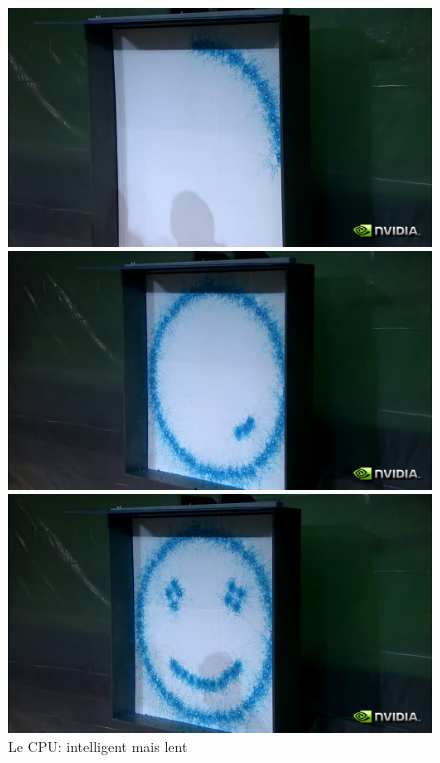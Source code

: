 \begin{figure}[h]
  \begin{minipage}[b]{0.30\linewidth}
    \centering
    \includegraphics[width=\linewidth]{images/pipeline/gpu00.png}
  \end{minipage}
  \hfill
  \begin{minipage}[b]{0.30\linewidth}
    \centering
    \includegraphics[width=\linewidth]{images/pipeline/gpu01.png}
  \end{minipage}
  \hfill
  \begin{minipage}[b]{0.30\linewidth}
    \centering
    \includegraphics[width=\linewidth]{images/pipeline/gpu02.png}
  \end{minipage}
  \caption{Le CPU: intelligent mais lent}
  \label{cpu00}
\end{figure}

